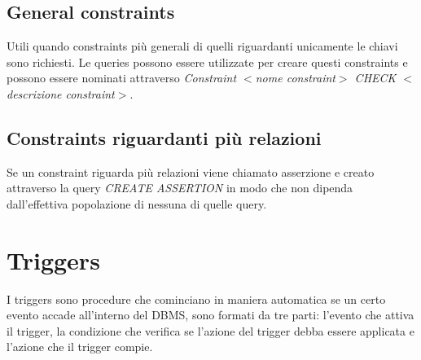 \subsection{General constraints}
Utili quando constraints pi\`u generali di quelli riguardanti unicamente le chiavi sono richiesti. Le queries possono essere utilizzate per creare questi
constraints e possono essere nominati attraverso \emph{Constraint $<$nome constraint$>$ CHECK $<$descrizione constraint$>$}.
\subsection{Constraints riguardanti pi\`u relazioni}
Se un constraint riguarda pi\`u relazioni viene chiamato asserzione e creato attraverso la query \emph{CREATE ASSERTION} in modo che non dipenda dall'effettiva popolazione di nessuna di quelle query. 
\section{Triggers}
I triggers sono procedure che cominciano in maniera automatica se un certo evento accade all'interno del DBMS, sono formati da tre parti: l'evento che
attiva il trigger, la condizione che verifica se l'azione del trigger debba essere applicata e l'azione che il trigger compie. 

